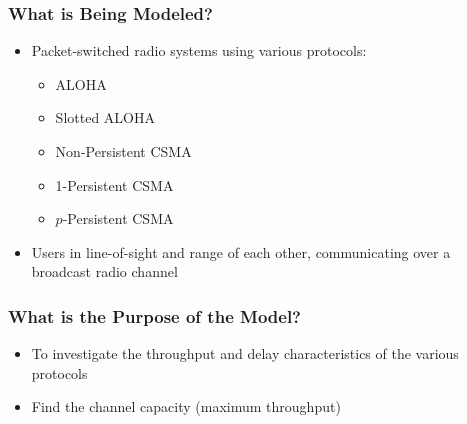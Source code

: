 \subsubsection{What is Being Modeled?}\label{subsubsec:Kleinrock_Tobagi_Model_What_Modeled}
\begin{itemize}[noitemsep]
\item Packet-switched radio systems using various protocols:
  \begin{itemize}[noitemsep]
  \item ALOHA
  \item Slotted ALOHA
  \item Non-Persistent CSMA
  \item 1-Persistent CSMA
  \item $p$-Persistent CSMA
\end{itemize}

\item Users in line-of-sight and range of each other, communicating over a broadcast radio channel
\end{itemize}

\subsubsection{What is the Purpose of the Model?}\label{subsubsec:Kleinrock_Tobagi_Model_Purpose}
\begin{itemize}[noitemsep]
\item To investigate the throughput and delay characteristics of the various protocols
\item Find the channel capacity (maximum throughput)
\end{itemize}

